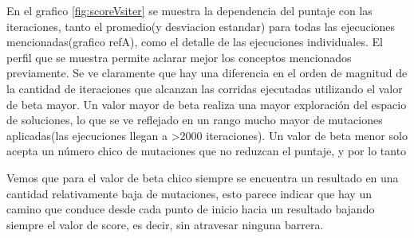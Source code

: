 En el grafico \ref{fig:scoreVsiter}
se muestra la dependencia del puntaje con las iteraciones, tanto el promedio(y desviacion estandar) para todas las ejecuciones mencionadas(grafico refA), como el detalle de las ejecuciones individuales.
El perfil que se muestra permite aclarar mejor los conceptos mencionados previamente. 
Se ve claramente que hay una diferencia en el orden de magnitud de la cantidad de iteraciones que alcanzan las corridas ejecutadas utilizando el valor de beta mayor.
Un valor mayor de beta realiza una mayor exploración del espacio de soluciones, lo que se ve reflejado en un rango mucho mayor de mutaciones aplicadas(las ejecuciones llegan a >2000 iteraciones).
Un valor de beta menor solo acepta un número chico de mutaciones que no reduzcan el puntaje, y por lo tanto 



Vemos que para el valor de beta chico siempre se encuentra un resultado en una cantidad relativamente baja de mutaciones,
esto parece indicar que hay un camino que conduce desde cada punto de inicio hacia un resultado bajando siempre el valor de score, es decir, sin atravesar ninguna barrera.



